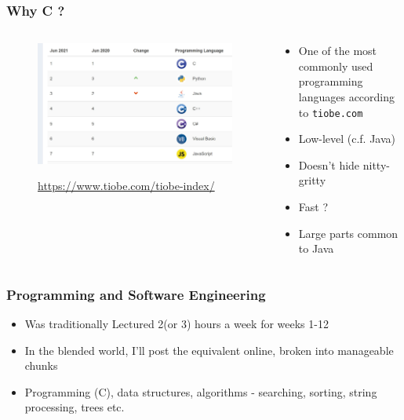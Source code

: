 \begin{frame}%
\frametitle{Why C ?}

\begin{columns}

\begin{column}{0.5\textwidth}
\begin{figure}[h]
\centerline{
\includegraphics[width=1.0\textwidth]{../Figs/tiobe.jpg}
}
\centerline{
{\tiny \url{https://www.tiobe.com/tiobe-index/}}
}
\end{figure}
\end{column}

\begin{column}{0.5\textwidth}
\begin{itemize}[<+->]
\item One of the most commonly used programming languages
according to {\tt tiobe.com}
\item Low-level (c.f. Java)
\item Doesn't hide nitty-gritty
\item Fast ?
\item Large parts common to Java
\end{itemize}
\end{column}

\end{columns}
\end{frame}

\begin{frame}%
\frametitle{Programming and Software Engineering}
\begin{itemize}[<+->]
\item Was traditionally Lectured 2(or 3) hours a week for weeks 1-12
\item In the blended world, I'll post the equivalent online, broken
into manageable chunks
\item Programming (C), data structures, algorithms - searching, sorting, string processing, trees etc.
\end{itemize}
\end{frame}

